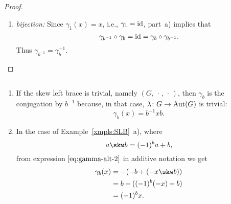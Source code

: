 \begin{proof}
\begin{enumerate}[\rm a)]
\begin{enumerate}[-]
                \item \textit{bijection:}
                    Since $\gamma_1(x) = x$, i.e., $\gamma_1=\operatorname{id}$, part~a) implies that
                    $$
                        \gamma_{b^{-1}}\circ\gamma_b=\operatorname{id}
                            =\gamma_b\circ\gamma_{b^{-1}}.
                    $$
                    Thus $\gamma_{b^{-1}}=\gamma_b^{-1}$.
        \end{enumerate}
    \end{enumerate}
\end{proof}

\begin{xmpls}${}$
    \begin{enumerate}[\rm a)]
        \item If the skew left brace is trivial, namely $(G,\,\cdot\,,\,\cdot\,)$, then $\gamma_b$ is the conjugation by $b^{-1}$ because, in that case, $\lambda\colon G\to{\rm Aut}(G)$ is trivial:
        $$
            \gamma_b(x) = b^{-1}xb.
        $$

        \item In the case of Example~\ref{xmpls:SLB}~a), where
        $$
            a\skw b = (-1)^ba + b,
        $$
        from expression $\eqref{eq:gamma-alt-2}$ in additive notation we get
        \begin{align*}
            \gamma_b(x) &= -(-b+(-x\skw b))\\
                &= b-((-1)^b(-x)+b)\\
                &= (-1)^bx.
        \end{align*}


\end{enumerate}
\end{xmpls}
